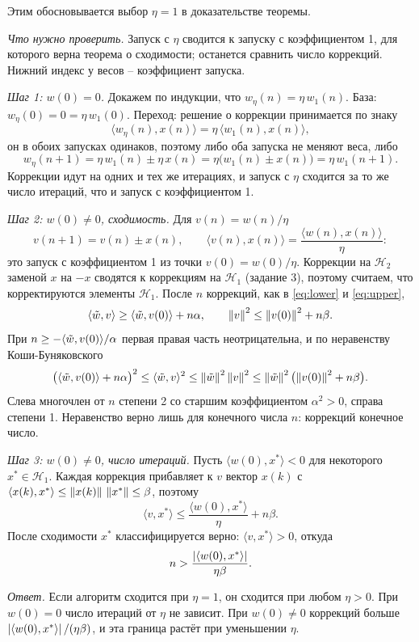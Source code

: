 \documentclass[12pt,a4paper]{article}
\begin{document}
\zachem Этим обосновывается выбор $\eta = 1$ в доказательстве теоремы.

\resh \emph{Что нужно проверить.} Запуск с $\eta$ сводится к запуску с
коэффициентом 1, для которого верна теорема о сходимости; останется сравнить
число коррекций. Нижний индекс у весов -- коэффициент запуска.

\emph{Шаг 1: $w(0) = 0$.} Докажем по индукции, что $w_\eta(n) = \eta\,w_1(n)$.
База: $w_\eta(0) = 0 = \eta\,w_1(0)$. Переход: решение о коррекции принимается по
знаку
\[
  \langle w_\eta(n), x(n)\rangle = \eta\,\langle w_1(n), x(n)\rangle ,
\]
он в обоих запусках одинаков, поэтому либо оба запуска не меняют веса, либо
\[
  w_\eta(n+1) = \eta\,w_1(n) \pm \eta\,x(n)
              = \eta\bigl(w_1(n) \pm x(n)\bigr) = \eta\,w_1(n+1) .
\]
Коррекции идут на одних и тех же итерациях, и запуск с $\eta$ сходится за то же
число итераций, что и запуск с коэффициентом 1.

\emph{Шаг 2: $w(0) \ne 0$, сходимость.} Для $v(n) = w(n)/\eta$
\[
  v(n+1) = v(n) \pm x(n),
  \qquad
  \langle v(n), x(n)\rangle = \frac{\langle w(n), x(n)\rangle}{\eta} :
\]
это запуск с коэффициентом 1 из точки $v(0) = w(0)/\eta$. Коррекции на
$\mathcal{H}_2$ заменой $x$ на $-x$ сводятся к коррекциям на $\mathcal{H}_1$
(задание 3), поэтому считаем, что корректируются элементы $\mathcal{H}_1$. После
$n$ коррекций, как в \eqref{eq:lower} и \eqref{eq:upper},
\[
  \langle \tilde{w}, v\rangle \ge \langle \tilde{w}, v(0)\rangle + n\alpha,
  \qquad
  \left\lVert v \right\rVert^2 \le \left\lVert v(0) \right\rVert^2 + n\beta .
\]
При $n \ge -\langle \tilde{w}, v(0)\rangle/\alpha$ первая правая часть неотрицательна,
и по неравенству Коши-Буняковского
\[
  \bigl(\langle \tilde{w}, v(0)\rangle + n\alpha\bigr)^2
  \le \langle \tilde{w}, v\rangle^2
  \le \left\lVert \tilde{w} \right\rVert^2\left\lVert v \right\rVert^2
  \le \left\lVert \tilde{w} \right\rVert^2\bigl(\left\lVert v(0) \right\rVert^2 + n\beta\bigr) .
\]
Слева многочлен от $n$ степени 2 со старшим коэффициентом $\alpha^2 > 0$, справа
степени 1. Неравенство верно лишь для конечного числа $n$: коррекций конечное
число.

\emph{Шаг 3: $w(0) \ne 0$, число итераций.} Пусть
$\langle w(0), x^*\rangle < 0$ для некоторого $x^* \in \mathcal{H}_1$. Каждая
коррекция прибавляет к $v$ вектор $x(k)$ с
$\langle x(k), x^*\rangle \le \left\lVert x(k) \right\rVert\,\left\lVert x^* \right\rVert \le \beta$, поэтому
\[
  \langle v, x^*\rangle \le \frac{\langle w(0), x^*\rangle}{\eta} + n\beta .
\]
После сходимости $x^*$ классифицируется верно: $\langle v, x^*\rangle > 0$, откуда
\[
  n > \frac{\left\lvert \langle w(0), x^*\rangle \right\rvert}{\eta\beta} .
\]

\emph{Ответ.} Если алгоритм сходится при $\eta = 1$, он сходится при любом
$\eta > 0$. При $w(0) = 0$ число итераций от $\eta$ не зависит. При $w(0) \ne 0$
коррекций больше $\left\lvert \langle w(0), x^*\rangle \right\rvert/(\eta\beta)$, и эта граница
растёт при уменьшении $\eta$.
\end{document}
